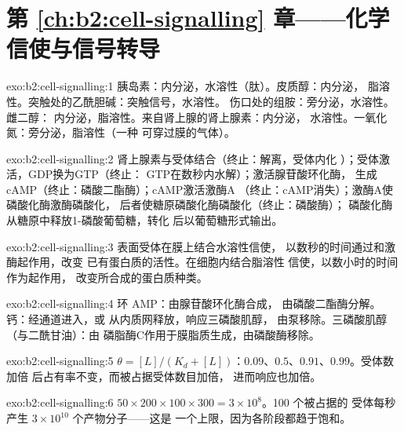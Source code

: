 \section*{第 \ref{ch:b2:cell-signalling} 章——化学信使与信号转导}

\begin{solution}{exo:b2:cell-signalling:1}
胰岛素：内分泌，水溶性（肽）。皮质醇：内分泌，
脂溶性。突触处的乙酰胆碱：突触信号，水溶性。
伤口处的组胺：旁分泌，水溶性。雌二醇：
内分泌，脂溶性。来自肾上腺的肾上腺素：内分泌，
水溶性。一氧化氮：旁分泌，脂溶性（一种
可穿过膜的气体）。
\end{solution}

\begin{solution}{exo:b2:cell-signalling:2}
肾上腺素与受体结合（终止：解离，受体内化
）；受体激活，GDP换为GTP（终止：
GTP在数秒内水解）；激活腺苷酸环化酶，
生成cAMP（终止：磷酸二酯酶）；cAMP激活激酶A
（终止：cAMP消失）；激酶A使磷酸化酶激酶磷酸化，
后者使糖原磷酸化酶磷酸化（终止：磷酸酶）；
磷酸化酶从糖原中释放1-磷酸葡萄糖，转化
后以葡萄糖形式输出。
\end{solution}

\begin{solution}{exo:b2:cell-signalling:3}
表面受体在膜上结合水溶性信使，
以数秒的时间通过和激酶起作用，改变
已有蛋白质的活性。在细胞内结合脂溶性
信使，以数小时的时间作为起作用，
改变所合成的蛋白质种类。
\end{solution}

\begin{solution}{exo:b2:cell-signalling:4}
环 AMP：由腺苷酸环化酶合成，
由磷酸二酯酶分解。钙：经通道进入，或
从内质网释放，响应三磷酸肌醇，
由泵移除。三磷酸肌醇（与二酰甘油）：由
磷脂酶C作用于膜脂质生成，由磷酸酶移除。
\end{solution}

\begin{solution}{exo:b2:cell-signalling:5}
$\theta = [L]/(K_d + [L])$：$0.09$、$0.5$、$0.91$、$0.99$。受体数加倍
后占有率不变，而被占据受体数目加倍，
进而响应也加倍。
\end{solution}

\begin{solution}{exo:b2:cell-signalling:6}
$50\times 200\times 100\times 300 = 3\times 10^{8}$。100 个被占据的
受体每秒产生 $3\times 10^{10}$ 个产物分子——这是
一个上限，因为各阶段都趋于饱和。
\end{solution}

